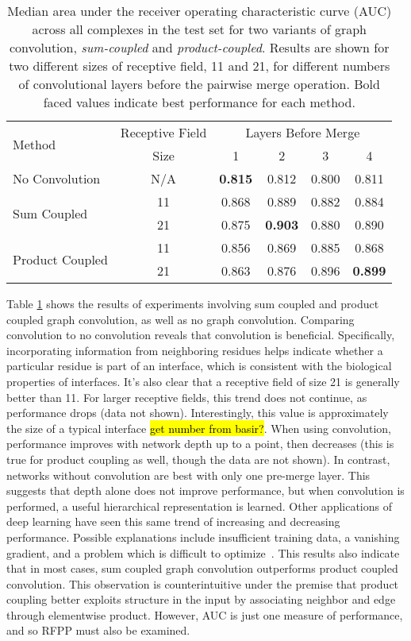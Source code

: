 \begin{table}
	\begin{center}
		\begin{tabular}{lccccc}
			\toprule
			\multirow{2}{*}{Method} &
			Receptive Field & \multicolumn{4}{c}{Layers Before Merge} \\
			& Size & 1 & {2} & {3} & {4} \\
			\midrule
			No Convolution & N/A & \textbf{0.815} & 0.812 & 0.800 & 0.811  \\\cline{1-6}
			\multirow{2}{*}{Sum Coupled} & 11 & 0.868 & 0.889 & 0.882 & 0.884 \\
			& 21 & 0.875 & \textbf{0.903} & 0.880 & 0.890 \\\cline{1-6}
			\multirow{2}{*}{Product Coupled} & 11 & 0.856 & 0.869 & 0.885 & 0.868 \\
			& 21 & 0.863 & 0.876 & 0.896 & \textbf{0.899} \\
			\bottomrule
		\end{tabular}
		\caption{Median area under the receiver operating characteristic curve (AUC) across all complexes in the test set for two variants of graph convolution, \textit{sum-coupled} and \textit{product-coupled}. Results are shown for two different sizes of receptive field, 11 and 21, for different numbers of convolutional layers before the pairwise merge operation. Bold faced values indicate best performance for each method.}
		\label{tab:med_auc}
	\end{center}
\end{table}

Table \ref{tab:med_auc} shows the results of experiments involving sum coupled and product coupled graph convolution, as well as no graph convolution.
Comparing convolution to no convolution reveals that convolution is beneficial.
Specifically, incorporating information from neighboring residues helps indicate whether a particular residue is part of an interface, which is consistent with the biological properties of interfaces.
It's also clear that a receptive field of size 21 is generally better than 11.
For larger receptive fields, this trend does not continue, as performance drops (data not shown).
Interestingly, this value is approximately the size of a typical interface \hl{get number from basir?}.
When using convolution, performance improves with network depth up to a point, then decreases (this is true for product coupling as well, though the data are not shown).
In contrast, networks without convolution are best with only one pre-merge layer.
This suggests that depth alone does not improve performance, but when convolution is performed, a useful hierarchical representation is learned.
Other applications of deep learning have seen this same trend of increasing and decreasing performance.
Possible explanations include insufficient training data, a vanishing gradient, and a problem which is difficult to optimize~\cite{he2015}.
This results also indicate that in most cases, sum coupled graph convolution outperforms product coupled convolution.
This observation is counterintuitive under the premise that product coupling better exploits structure in the input by associating neighbor and edge through elementwise product.
However, AUC is just one measure of performance, and so RFPP must also be examined.

